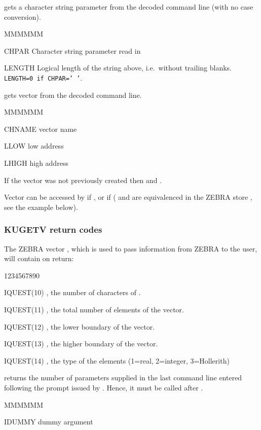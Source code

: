 \Action gets a character string parameter from the
decoded command line
(with no case conversion).
\Pdesc\begin{DLtt}{MMMMMM}
\item[CHPAR] Character string parameter read in
\item[LENGTH] Logical length of the string above, i.e.\ without
trailing blanks.
{\tt LENGTH=0 if CHPAR=' '}.
\end{DLtt}

\Action gets vector from the
decoded command line.
\Pdesc\begin{DLtt}{MMMMMM}
\item[CHNAME] vector name
\item[LLOW] low address
\item[LHIGH] high address
\end{DLtt}
\Remark
If the vector was not previously created then  and .

Vector  can be accessed by  if ,
or  if 
( and  are equivalenced in the ZEBRA
store , see the example below).

\subsubsection*{KUGETV return codes}

The ZEBRA vector , which is used to pass information
from ZEBRA to the user, will contain on return:

\begin{DLtt}{1234567890}
\item[IQUEST(10)] , the number of characters of .
\item[IQUEST(11)] , the total number of elements of the vector.
\item[IQUEST(12)] , the lower boundary of the vector.
\item[IQUEST(13)] , the higher boundary of the vector.
\item[IQUEST(14)] , the type of the elements (1=real, 2=integer, 3=Hollerith)
\end{DLtt}

\Action returns the number of parameters supplied
in the last command line entered
following the prompt issued by \KUGETx{}. Hence, it must
be called after \KUGETx{}.
\Pdesc\begin{DLtt}{MMMMMM}
\item[IDUMMY] dummy argument
\end{DLtt}



